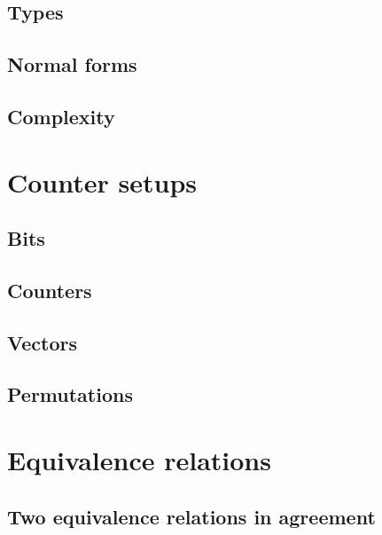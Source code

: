 \documentclass{scrbook}
\begin{document}
\section{Types}


\section{Normal forms}\label{sec:scott-nf}


\section{Complexity}\label{sec:complexity}





\chapter{Counter setups}
\section{Bits}


\section{Counters}


\section{Vectors}


\section{Permutations}


\chapter{Equivalence relations}


\section{Two equivalence relations in agreement}

\end{document}
